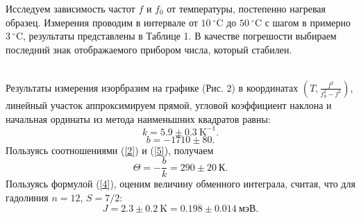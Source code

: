 \documentclass[a4paper,12pt]{article}
\theoremstyle{definition}
\begin{document}
Исследуем зависимость частот $f$ и $f_0$ от температуры, постепенно нагревая образец. Измерения  проводим в интервале от $10~^\circ \text{C}$ до $50~^\circ \text{C}$ с шагом в примерно $3~^\circ \text{C}$, результаты представлены в Таблице 1. В качестве погрешости выбираем последний знак отображаемого прибором числа, который стабилен.
\vspace{15pt}
\begin{figure}[h]
\begin{floatrow}
\end{floatrow}
\end{figure}\\
Результаты измерения изорбразим на графике (Рис. 2) в координатах $\left( T, \frac{f^2}{f_0^2-f^2}\right)$, линейный участок аппроксимируем прямой, угловой коэффициент наклона и начальная ординаты из метода наименьшних квадратов равны:
\[k = 5.9 \pm 0.3~\text{K}^{-1}.\]
\[b = -1710 \pm 80.\]
Пользуясь соотношениями (\ref{2}) и (\ref{5}), получаем
\[\Theta = -\dfrac{b}{k} = 290 \pm 20~\text{К}.\]
Пользуясь формулой (\ref{4}), оценим величину обменного интеграла, считая, что для гадолиния $n = 12$, $S = 7/2$:
\[J = 2.3 \pm 0.2~\text{K} = 0.198\pm 0.014~\text{мэВ}.\]
\end{document}
